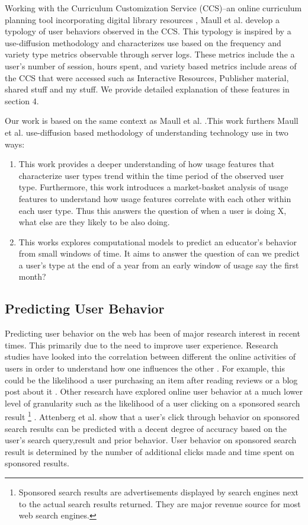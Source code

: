 \documentclass{acm_proc_article-sp}
\begin{document}
Working with the Curriculum Customization Service (CCS)--an online curriculum planning tool incorporating digital library resources \cite{sumner:team}, Maull et al. \cite{maullunderstanding} develop a typology of user behaviors observed in the CCS. This typology is inspired by a use-diffusion methodology and characterizes use based on the frequency and variety type metrics observable through server logs. These metrics include the a user's number of session, hours spent, and variety based metrics include areas of the CCS that were accessed such as Interactive Resources, Publisher material, shared stuff and my stuff. We provide detailed explanation of these features in section 4. 

Our work is based on the same context as Maull et al.\cite{maullunderstanding} .This work furthers Maull et al. \cite{maullunderstanding} use-diffusion based methodology of understanding technology use in two ways: 
\begin{enumerate}
\item This work provides a deeper understanding of how usage features that characterize user types trend within the time period of the observed user type. Furthermore, this work introduces a market-basket analysis of usage features to understand how usage features correlate with each other within each user type. Thus this answers the question of when a user is doing X, what else are they likely to be also doing.

\item This works explores computational models to predict an educator's behavior from small windows of time. It aims to answer the question of can we predict a user's type at the end of a year from an early window of usage say the first month?
\end{enumerate}

\subsection{Predicting User Behavior}
Predicting user behavior on the web has been of major research interest in recent times. This primarily due to the need to improve user experience.  Research studies have looked into the correlation between different the online activities of users in order to understand how one influences the other \cite{adar2007we}. For example, this could be the likelihood a user purchasing an item after reading reviews or a blog post about it \cite{adar2007we}. Other research have explored online user behavior at a much lower level of granularity such as the likelihood of a user clicking on a sponsored search result \footnote{Sponsored search results are advertisements displayed by search engines next to the actual search results returned. They are major revenue source for most web search engines.} \cite{Attenberg:2009}. Attenberg et al. \cite{Attenberg:2009} show that a user's click through behavior on sponsored search results can be predicted with a decent degree of accuracy based on the user's search query,result and prior behavior. User behavior on sponsored search result is determined by the number of additional clicks made and time spent on sponsored results.
\end{document}

